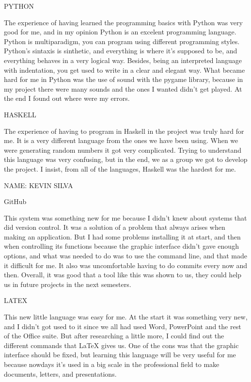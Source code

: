 PYTHON

The experience of having learned the programming basics with Python was very good for me, and in my opinion Python is an excelent programming language. Python is multiparadigm, you can program using different programming styles. Python's sintaxis is sinthetic, and everything is where it's supposed to be, and everything behaves in a very logical way. Besides, being an interpreted language with indentation, you get used to write in a clear and elegant way.
What became hard for me in Python was the use of sound with the pygame library, because in my project there were many sounds and the ones I wanted didn't get played. At the end I found out where were my errors.


HASKELL

The experience of having to program in Haskell in the project was truly hard for me. It is a very different language from the ones we have been using. When we were generating random numbers it got very complicated. Trying to understand this language was very confusing, but in the end, we as a group we got to develop the project. I insist, from all of the languages, Haskell was the hardest for me.


NAME:         KEVIN SILVA


GitHub

This system was something new for me because I didn't knew about systems that did version control. It was a solution of a problem that always arises when making an application. But I had some problems installing it at start, and then when controlling its functions because the graphic interface didn't gave enough options, and what was needed to do was to use the command line, and that made it difficult for me. It also was uncomfortable having to do commits every now and then.
Overall, it was good that a tool like this was shown to us, they could help us in future projects in the next semesters.

LATEX

This new little language was easy for me. At the start it was something very new, and I didn't got used to it since we all had used Word, PowerPoint and the rest of the Office suite. But after researching a little more, I could find out the different commands that LaTeX gives us. One of the cons was that the graphic interface should be fixed, but learning this language will be very useful for me because nowdays it's used in a big scale in the professional field to make documents, letters, and presentations.


